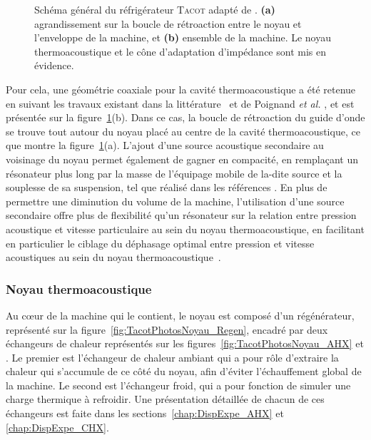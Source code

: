 \begin{figure}[!ht]
    \centering
    
    \caption{Schéma général du réfrigérateur \textsc{Tacot} adapté de \cite{ramadan_design_2021}. \textbf{(a)} agrandissement sur la boucle de rétroaction entre le noyau et l'enveloppe de la machine, et \textbf{(b)} ensemble de la machine. Le noyau thermoacoustique et le cône d'adaptation d'impédance sont mis en évidence.}
    \label{fig:SchemaGeneralTACOT}
\end{figure}


Pour cela, une géométrie coaxiale pour la cavité thermoacoustique a été retenue en suivant les travaux existant dans la littérature~\cite{tijani_study_2008} et de Poignand \textit{et al.} \cite{poignand_thermoacoustic_2011, poignand_analysis_2013}, et est présentée sur la figure~\ref{fig:SchemaGeneralTACOT}(b). Dans ce cas, la boucle de rétroaction du guide d'onde se trouve tout autour du noyau placé au centre de la cavité thermoacoustique, ce que montre la figure~\ref{fig:SchemaGeneralTACOT}(a). L'ajout d'une source acoustique secondaire au voisinage du noyau permet également de gagner en compacité, en remplaçant un résonateur plus long par la masse de l'équipage mobile de la-dite source et la souplesse de sa suspension, tel que réalisé dans les références \cite{poese_thermoacoustic_2004, poignand_thermoacoustic_2011, poignand_analysis_2013}. En plus de permettre une diminution du volume de la machine, l'utilisation d'une source secondaire offre plus de flexibilité qu'un résonateur sur la relation entre pression acoustique et vitesse particulaire au sein du noyau thermoacoustique, en facilitant en particulier le ciblage du déphasage optimal entre pression et vitesse acoustiques au sein du noyau thermoacoustique~\cite{poignand_thermoacoustic_2011, poignand_analysis_2013}.\smallskip


\subsubsection{Noyau thermoacoustique}
Au c\oe{}ur de la machine qui le contient, le noyau est composé d'un régénérateur, représenté sur la figure~\ref{fig:TacotPhotosNoyau_Regen}, encadré par deux échangeurs de chaleur représentés sur les figures~\ref{fig:TacotPhotosNoyau_AHX} et . Le premier est l'échangeur de chaleur ambiant qui a pour rôle d'extraire la chaleur qui s'accumule de ce côté du noyau, afin d'éviter l'échauffement global de la machine. Le second est l'échangeur froid, qui a pour fonction de simuler une charge thermique à refroidir. Une présentation détaillée de chacun de ces échangeurs est faite dans les sections~\ref{chap:DispExpe_AHX} et \ref{chap:DispExpe_CHX}.

